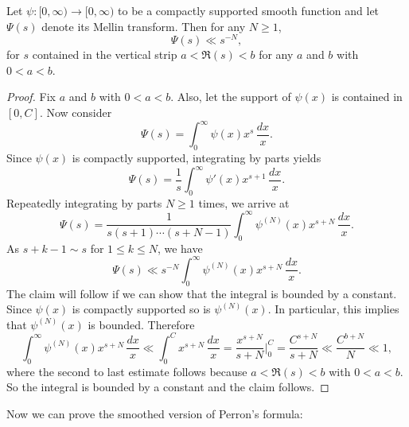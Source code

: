       \begin{proposition}\label{prop:smoothing_function_Mellin_inverse_vertical_strips}
        Let $\psi:[0,\infty) \to [0,\infty)$ to be a compactly supported smooth function and let $\Psi(s)$ denote its Mellin transform. Then for any $N \ge 1$,
        \[
          \Psi(s) \ll s^{-N},
        \]
        for $s$ contained in the vertical strip $a < \Re(s) < b$ for any $a$ and $b$ with $0 < a < b$.
      \end{proposition}
      \begin{proof}
        Fix $a$ and $b$ with $0 < a < b$. Also, let the support of $\psi(x)$ is contained in $[0,C]$. Now consider
        \[
          \Psi(s) = \int_{0}^{\infty}\psi(x)x^{s}\,\frac{dx}{x}.
        \]
        Since $\psi(x)$ is compactly supported, integrating by parts yields
        \[
          \Psi(s) = \frac{1}{s}\int_{0}^{\infty}\psi'(x)x^{s+1}\,\frac{dx}{x}.
        \]
        Repeatedly integrating by parts $N \ge 1$ times, we arrive at
        \[
          \Psi(s) = \frac{1}{s(s+1) \cdots (s+N-1)}\int_{0}^{\infty}\psi^{(N)}(x)x^{s+N}\,\frac{dx}{x}.
        \]
        As $s+k-1 \sim s$ for $1 \le k \le N$, we have
        \[
          \Psi(s) \ll s^{-N}\int_{0}^{\infty}\psi^{(N)}(x)x^{s+N}\,\frac{dx}{x}.
        \]
        The claim will follow if we can show that the integral is bounded by a constant. Since $\psi(x)$ is compactly supported so is $\psi^{(N)}(x)$. In particular, this implies that $\psi^{(N)}(x)$ is bounded. Therefore
        \[
          \int_{0}^{\infty}\psi^{(N)}(x)x^{s+N}\,\frac{dx}{x} \ll \int_{0}^{C}x^{s+N}\,\frac{dx}{x} = \frac{x^{s+N}}{s+N}\bigg|_{0}^{C} = \frac{C^{s+N}}{s+N} \ll \frac{C^{b+N}}{N} \ll 1,
        \]
        where the second to last estimate follows because $a < \Re(s) < b$ with $0 < a < b$. So the integral is bounded by a constant and the claim follows.
      \end{proof}
      
      Now we can prove the smoothed version of Perron's formula:

